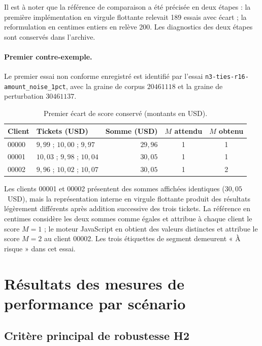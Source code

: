 Il est à noter que la référence de comparaison a été précisée en deux étapes : la première
implémentation en virgule flottante relevait 189 essais avec écart ; la reformulation en
centimes entiers en relève 200. Les diagnostics des deux étapes sont conservés dans l'archive.

\paragraph{Premier contre-exemple.}
Le premier essai non conforme enregistré est identifié par l'essai
\texttt{n3\allowbreak-ties\allowbreak-r16\allowbreak-amount\_noise\_1pct}, avec la graine de
corpus $20461118$ et la graine de perturbation $30461137$.

\begin{table}[htb]
  \centering
  \caption{Premier écart de score conservé (montants en USD).}
  \label{tab:resultats-contre-exemple}
  \begin{tabular}{llrcc}
    \toprule
    Client & Tickets (USD) & Somme (USD) & $M$ attendu & $M$ obtenu \\
    \midrule
    00000 & $9{,}99$ ; $10{,}00$ ; $9{,}97$ & $29{,}96$ & 1 & 1 \\
    00001 & $10{,}03$ ; $9{,}98$ ; $10{,}04$ & $30{,}05$ & 1 & 1 \\
    00002 & $9{,}96$ ; $10{,}02$ ; $10{,}07$ & $30{,}05$ & 1 & 2 \\
    \bottomrule
  \end{tabular}
\end{table}

Les clients 00001 et 00002 présentent des sommes affichées identiques ($30{,}05$~USD), mais
la représentation interne en virgule flottante produit des résultats légèrement différents
après addition successive des trois tickets. La référence en centimes considère les deux
sommes comme égales et attribue à chaque client le score $M = 1$ ; le moteur JavaScript
en obtient des valeurs distinctes et attribue le score $M = 2$ au client 00002. Les trois
étiquettes de segment demeurent « À risque » dans cet essai.

\section{Résultats des mesures de performance par scénario}
\label{sec:resultats-performance}

\subsection{Critère principal de robustesse H2}
\label{subsec:resultats-h2}

